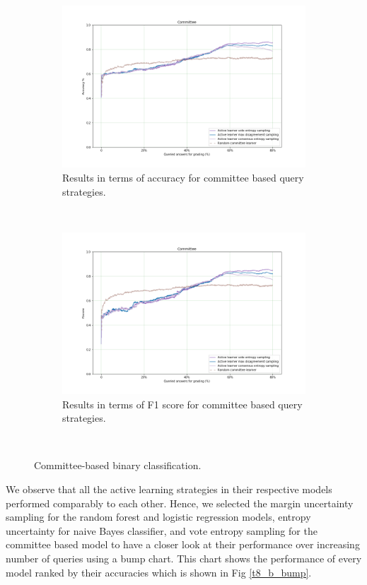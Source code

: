 \begin{figure}[!htb]
	\begin{subfigure}[b]{0.5\textwidth}
		\includegraphics[width=\textwidth]{images/binary/task8_accuracy_com}
		\caption{Results in terms of accuracy for committee based query strategies.}
		\label{t8_b_com}
	\end{subfigure}
	~
	\begin{subfigure}[b]{0.5\textwidth}
		\includegraphics[width=\textwidth]{images/binary/task8_f1score_com}
		\caption{Results in terms of F1 score for committee based query strategies.}
		\label{t8_b_com_f1}
	\end{subfigure}
	~
	\caption{Committee-based binary classification.}
\end{figure}

We observe that all the active learning strategies in their respective models performed comparably to each other. Hence, we selected the margin uncertainty sampling for the random forest and logistic regression models, entropy uncertainty for naive Bayes classifier, and vote entropy sampling for the committee based model to have a closer look at their performance over increasing number of queries using a bump chart. This chart shows the performance of every model ranked by their accuracies which is shown in Fig \ref{t8_b_bump}.

